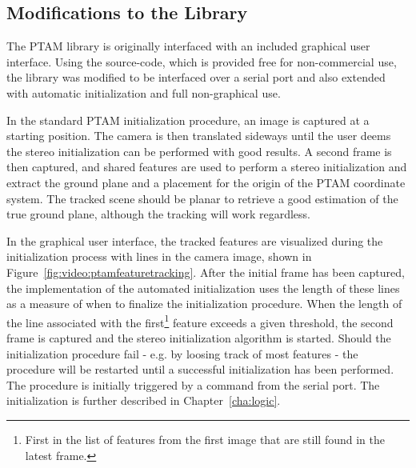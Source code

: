        \subsection{Modifications to the Library}
            The PTAM library is originally interfaced with an included graphical user interface.
            Using the source-code, which is provided free for non-commercial use, the
            library was modified to be interfaced over a serial port
            and also extended with automatic initialization and full non-graphical use.

            In the standard PTAM initialization procedure, an image is captured
            at a starting position. The camera is then translated sideways until the user
            deems the stereo initialization can be performed with good results.
            A second frame is then captured, and shared features are used
            to perform a stereo initialization and extract the ground plane
            and a placement for the origin of the PTAM coordinate system.
            The tracked scene should be planar to retrieve a good estimation
            of the true ground plane, although the tracking will work regardless.


            In the graphical user interface, the tracked features are visualized
            during the initialization process with lines in the camera image,
            shown in Figure~\ref{fig:video:ptamfeaturetracking}.
            After the initial frame has been captured, the implementation
            of the automated initialization uses the length of these lines as
            a measure of when to finalize the initialization procedure.
            When the length of the line associated with the first\footnote{First in the list of features from the first image that are still found in the latest frame.}
            feature exceeds a given threshold, the second frame is
            captured and the stereo initialization algorithm is started.
            Should the initialization procedure fail - e.g. by loosing track of most features - the
            procedure will be restarted until a successful initialization has been performed.
            The procedure is initially triggered by a command from the serial port.
            The initialization is further described in Chapter~\ref{cha:logic}.

